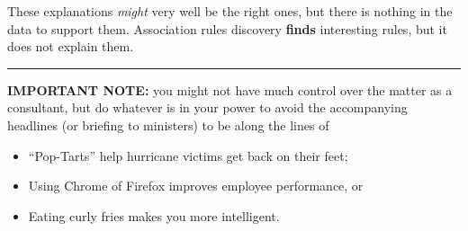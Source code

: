 These explanations \textit{might} very well be the right ones, but there is nothing in the data to support them. Association rules discovery \textbf{finds} interesting rules, but it does not explain them. 
\begin{center}
    \rule{0.5\textwidth}{.4pt}
\end{center}
\textbf{IMPORTANT NOTE:} you might not have much control over the matter as a consultant, but do whatever is in your power to avoid the accompanying headlines (or briefing to ministers) to be along the lines of 
\begin{itemize}[noitemsep]
\item ``Pop-Tarts'' help hurricane victims get back on their feet; 
\item Using Chrome of Firefox improves employee performance, or 
\item Eating curly fries makes you more intelligent. 
\end{itemize}
